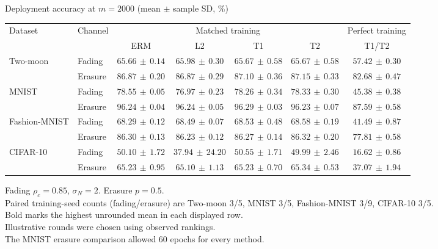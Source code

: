 \documentclass[border=4pt]{standalone}
\begin{document}
\begin{minipage}{7.8in}
\centering
Deployment accuracy at $m=2000$ (mean $\pm$ sample SD, \%)\\[4pt]
\begin{tabular*}{\linewidth}{@{\extracolsep{\fill}}llccccc@{}}
\toprule
\multirow{2}{*}{Dataset} & \multirow{2}{*}{Channel} & \multicolumn{4}{c}{Matched training} & Perfect training \\
\cmidrule(lr){3-6}\cmidrule(l){7-7}
 & & ERM & L2 & T1 & T2 & T1/T2 \\
\midrule
\multirow{2}{*}{Two-moon} & Fading & $65.66\,\pm\,0.14$ & $\mathbf{65.98}\,\pm\,0.30$ & $65.67\,\pm\,0.58$ & $65.67\,\pm\,0.58$ & $57.42\,\pm\,0.30$ \\
 & Erasure & $86.87\,\pm\,0.20$ & $86.87\,\pm\,0.29$ & $87.10\,\pm\,0.36$ & $\mathbf{87.15}\,\pm\,0.33$ & $82.68\,\pm\,0.47$ \\
\midrule[0.25pt]
\multirow{2}{*}{MNIST} & Fading & $\mathbf{78.55}\,\pm\,0.05$ & $76.97\,\pm\,0.23$ & $78.26\,\pm\,0.34$ & $78.33\,\pm\,0.30$ & $45.38\,\pm\,0.38$ \\
 & Erasure & $96.24\,\pm\,0.04$ & $96.24\,\pm\,0.05$ & $\mathbf{96.29}\,\pm\,0.03$ & $96.23\,\pm\,0.07$ & $87.59\,\pm\,0.58$ \\
\midrule[0.25pt]
\multirow{2}{*}{Fashion-MNIST} & Fading & $68.29\,\pm\,0.12$ & $68.49\,\pm\,0.07$ & $68.53\,\pm\,0.48$ & $\mathbf{68.58}\,\pm\,0.19$ & $41.49\,\pm\,0.87$ \\
 & Erasure & $86.30\,\pm\,0.13$ & $86.23\,\pm\,0.12$ & $86.27\,\pm\,0.14$ & $\mathbf{86.32}\,\pm\,0.20$ & $77.81\,\pm\,0.58$ \\
\midrule[0.25pt]
\multirow{2}{*}{CIFAR-10} & Fading & $50.10\,\pm\,1.72$ & $37.94\,\pm\,24.20$ & $\mathbf{50.55}\,\pm\,1.71$ & $49.99\,\pm\,2.46$ & $16.62\,\pm\,0.86$ \\
 & Erasure & $65.23\,\pm\,0.95$ & $65.10\,\pm\,1.13$ & $65.23\,\pm\,0.70$ & $\mathbf{65.34}\,\pm\,0.53$ & $37.07\,\pm\,1.94$ \\
\bottomrule
\end{tabular*}
\par\smallskip\raggedright\footnotesize
Fading $\rho_c=0.85$, $\sigma_N=2$. Erasure $p=0.5$.\\
Paired training-seed counts (fading/erasure) are Two-moon 3/5, MNIST 3/5, Fashion-MNIST 3/9, CIFAR-10 3/5.\\
Bold marks the highest unrounded mean in each displayed row.\\
Illustrative rounds were chosen using observed rankings.\\
The MNIST erasure comparison allowed 60 epochs for every method.
\end{minipage}
\end{document}
